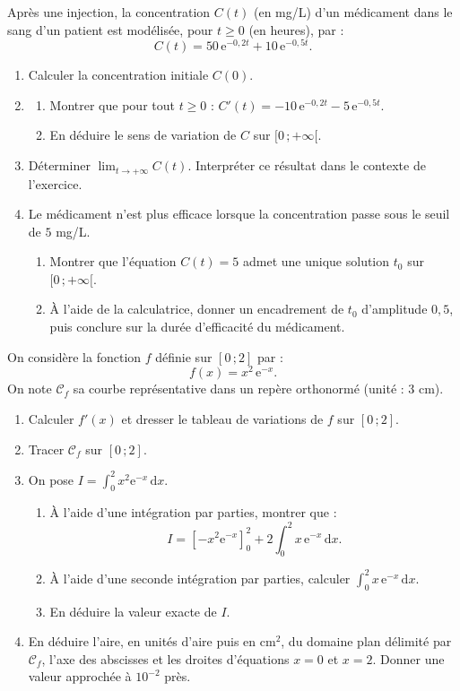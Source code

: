 \documentclass[11pt]{article}
\begin{document}
\begin{exercice}
Après une injection, la concentration $C(t)$ (en mg/L) d'un médicament dans le sang d'un patient est modélisée, pour $t\geq 0$ (en heures), par :
\[ C(t)=50\,\mathrm{e}^{-0,2t}+10\,\mathrm{e}^{-0,5t}. \]
\begin{enumerate}
\item Calculer la concentration initiale $C(0)$.
\item \begin{enumerate}
\item Montrer que pour tout $t\geq 0$ : $C'(t)=-10\,\mathrm{e}^{-0,2t}-5\,\mathrm{e}^{-0,5t}$.
\item En déduire le sens de variation de $C$ sur $[0\,;+\infty[$.
\end{enumerate}
\item Déterminer $\displaystyle\lim_{t\to +\infty}C(t)$. Interpréter ce résultat dans le contexte de l'exercice.
\item Le médicament n'est plus efficace lorsque la concentration passe sous le seuil de $5$ mg/L.
\begin{enumerate}
\item Montrer que l'équation $C(t)=5$ admet une unique solution $t_{0}$ sur $[0\,;+\infty[$.
\item À l'aide de la calculatrice, donner un encadrement de $t_{0}$ d'amplitude $0,5$, puis conclure sur la durée d'efficacité du médicament.
\end{enumerate}
\end{enumerate}
\end{exercice}

\begin{exercice}
On considère la fonction $f$ définie sur $[0\,;2]$ par :
\[ f(x)=x^{2}\,\mathrm{e}^{-x}. \]
On note $\mathcal{C}_{f}$ sa courbe représentative dans un repère orthonormé (unité : 3 cm).
\begin{enumerate}
\item Calculer $f'(x)$ et dresser le tableau de variations de $f$ sur $[0\,;2]$.
\item Tracer $\mathcal{C}_{f}$ sur $[0\,;2]$.
\item On pose $I=\displaystyle\int_{0}^{2}x^{2}\mathrm{e}^{-x}\,\mathrm{d}x$.
\begin{enumerate}
\item À l'aide d'une intégration par parties, montrer que :
\[ I=\left[-x^{2}\mathrm{e}^{-x}\right]_{0}^{2}+2\int_{0}^{2}x\,\mathrm{e}^{-x}\,\mathrm{d}x. \]
\item À l'aide d'une seconde intégration par parties, calculer $\displaystyle\int_{0}^{2}x\,\mathrm{e}^{-x}\,\mathrm{d}x$.
\item En déduire la valeur exacte de $I$.
\end{enumerate}
\item En déduire l'aire, en unités d'aire puis en $\mathrm{cm}^{2}$, du domaine plan délimité par $\mathcal{C}_{f}$, l'axe des abscisses et les droites d'équations $x=0$ et $x=2$. Donner une valeur approchée à $10^{-2}$ près.
\end{enumerate}
\end{exercice}
\end{document}
